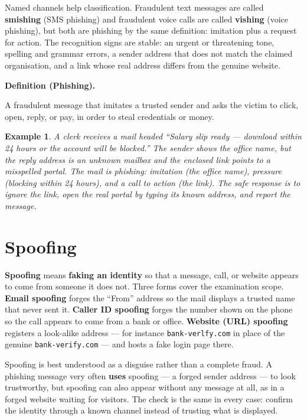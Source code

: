 \documentclass[11pt]{article}
\newtheorem{example}{Example}[section]
\newenvironment{definitionbox}[1]{%
  \par\noindent\textbf{Definition (#1).}\ \itshape
}{\par\vspace{0.3em}}
\begin{document}
Named channels help classification. Fraudulent text messages are called
\textbf{smishing} (SMS phishing) and fraudulent voice calls are called
\textbf{vishing} (voice phishing), but both are phishing by the same
definition: imitation plus a request for action. The recognition signs
are stable: an urgent or threatening tone, spelling and grammar errors,
a sender address that does not match the claimed organisation, and a
link whose real address differs from the genuine website.

\begin{definitionbox}{Phishing}
A fraudulent message that imitates a trusted sender and asks the victim
to click, open, reply, or pay, in order to steal credentials or money.
\end{definitionbox}

\begin{example}
A clerk receives a mail headed ``Salary slip ready --- download within
24 hours or the account will be blocked.'' The sender shows the office
name, but the reply address is an unknown mailbox and the enclosed
link points to a misspelled portal. The mail is phishing: imitation (the
office name), pressure (blocking within 24 hours), and a call to action
(the link). The safe response is to ignore the link, open the real
portal by typing its known address, and report the message.
\end{example}

\section{Spoofing}
\textbf{Spoofing} means \textbf{faking an identity} so that a message,
call, or website appears to come from someone it does not. Three forms
cover the examination scope. \textbf{Email spoofing} forges the
``From'' address so the mail displays a trusted name that never sent
it. \textbf{Caller ID spoofing} forges the number shown on the phone so
the call appears to come from a bank or office. \textbf{Website (URL)
spoofing} registers a look-alike address --- for instance
\texttt{bank-verlfy.com} in place of the genuine
\texttt{bank-verify.com} --- and hosts a fake login page there.

Spoofing is best understood as a disguise rather than a complete fraud.
A phishing message very often \textbf{uses} spoofing --- a forged
sender address --- to look trustworthy, but spoofing can also appear
without any message at all, as in a forged website waiting for
visitors. The check is the same in every case: confirm the identity
through a known channel instead of trusting what is displayed.
\end{document}
